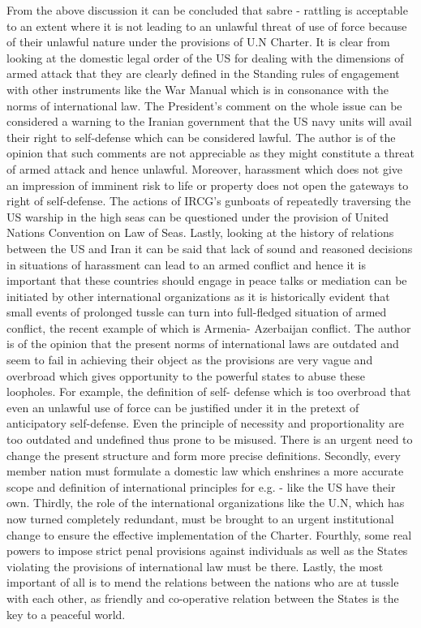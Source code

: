 \begin{multicols}{2}
\noi
From the above discussion it can be concluded that sabre - rattling is acceptable to an extent
where it is not leading to an unlawful threat of use of force because of their unlawful nature
under the provisions of U.N Charter. It is clear from looking at the domestic legal order of
the US for dealing with the dimensions of armed attack that they are clearly defined in the
Standing rules of engagement with other instruments like the War Manual which is in
consonance with the norms of international law. The President’s comment on the whole
issue can be considered a warning to the Iranian government that the US navy units will
avail their right to self-defense which can be considered lawful. The author is of the opinion
that such comments are not appreciable as they might constitute a threat of armed attack and
hence unlawful. Moreover, harassment which does not give an impression of imminent risk
to life or property does not open the gateways to right of self-defense. The actions of IRCG’s
gunboats of repeatedly traversing the US warship in the high seas can be questioned under
the provision of United Nations Convention on Law of Seas. Lastly, looking at the history
of relations between the US and Iran it can be said that lack of sound and reasoned decisions
in situations of harassment can lead to an armed conflict and hence it is important that these 
countries should engage in peace talks or mediation can be initiated by other international
organizations as it is historically evident that small events of prolonged tussle can turn into
full-fledged situation of armed conflict, the recent example of which is Armenia- Azerbaijan
conflict. The author is of the opinion that the present norms of international laws are
outdated and seem to fail in achieving their object as the provisions are very vague and
overbroad which gives opportunity to the powerful states to abuse these loopholes. For
example, the definition of self- defense which is too overbroad that even an unlawful use of
force can be justified under it in the pretext of anticipatory self-defense. Even the principle
of necessity and proportionality are too outdated and undefined thus prone to be misused.
There is an urgent need to change the present structure and form more precise definitions.
Secondly, every member nation must formulate a domestic law which enshrines a more
accurate scope and definition of international principles for e.g. - like the US have their
own. Thirdly, the role of the international organizations like the U.N, which has now turned
completely redundant, must be brought to an urgent institutional change to ensure the
effective implementation of the Charter. Fourthly, some real powers to impose strict penal
provisions against individuals as well as the States violating the provisions of international
law must be there. Lastly, the most important of all is to mend the relations between the
nations who are at tussle with each other, as friendly and co-operative relation between the
States is the key to a peaceful world.

\end{multicols}

